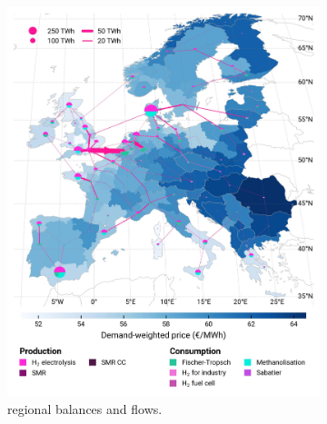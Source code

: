 \documentclass[final,5p,times,twocolumn,sort&compress]{elsarticle}
\begin{document}
\begin{figure}[htbp]
  \centering
  \begin{subfigure}[t]{0.49\textwidth}
      \vspace{0pt}
      \includegraphics[width=1\textwidth]{maps/greenfield-pipelines/base_s_adm___2050-balance_map_H2}
      \vspace{-0.5cm}
      \caption{ regional balances and flows.}
      \label{fig:CP_lt_2050_h2}
  \end{subfigure}
  \hfill
  \begin{subfigure}[t]{0.49\textwidth}
      \vspace{0pt}

\end{subfigure}
\end{figure}
\end{document}
